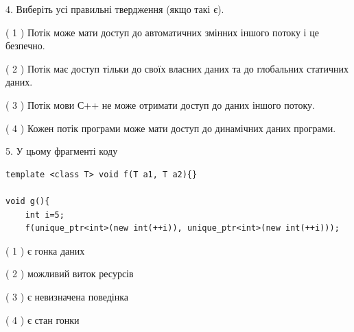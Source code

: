 \documentclass[12pt, ukrainian]{article}
\begin{document}
\begin {large}
{%
4. Виберіть усі правильні твердження (якщо такі є).\par
\vspace{2mm}

( 1 ) Потік може мати доступ до автоматичних змінних іншого потоку і це безпечно.%

( 2 ) Потік має доступ тільки до своїх власних даних та до глобальних статичних даних.%

( 3 ) Потік мови С++ не може отримати доступ до даних іншого потоку.%

( 4 ) Кожен потік програми може мати доступ до динамічних даних програми.%


5. У цьому фрагменті коду
\begin{verbatim}
template <class T> void f(T a1, T a2){}

void g(){
    int i=5;
    f(unique_ptr<int>(new int(++i)), unique_ptr<int>(new int(++i)));
\end{verbatim}

( 1 ) є гонка даних%

( 2 ) можливий виток ресурсів%

( 3 ) є невизначена поведінка%

( 4 ) є стан гонки%
}
\end {large}
\end{document}
